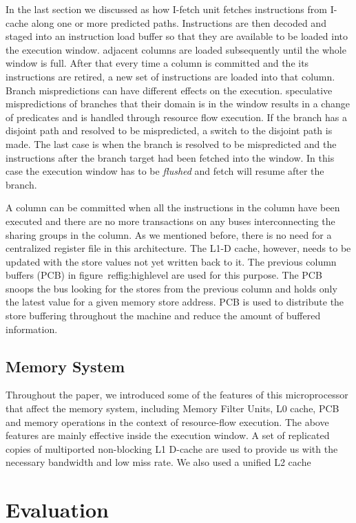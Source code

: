 \documentclass[10pt,twocolumn]{IEEEtran}
\begin{document}
In the last section we discussed as how I-fetch unit  fetches
instructions from I-cache along one or more predicted paths.
Instructions are then decoded and staged into an instruction load
buffer so that they are available to be loaded into the execution
window.  adjacent columns are loaded subsequently until the whole
window is full.  After that every time a column is committed and the
its instructions are retired, a new set of instructions are loaded into
that column.  Branch mispredictions can have different effects on the
execution.  speculative mispredictions of branches that their domain is
in the window results in a change of predicates and is handled through
resource flow execution.  If the branch has a disjoint path and
resolved to be mispredicted, a switch to the disjoint path is made.
The last case is when the branch is resolved to be mispredicted and the
instructions after the branch target had been fetched into the window.
In this case the execution window has to be \emph{flushed} and fetch
will resume after the branch.

A column can be committed when all the instructions in the column have
been executed and there are no more transactions on any buses
interconnecting the sharing groups in the column.  As we mentioned
before, there is no need for a centralized register file in this
architecture.  The L1-D cache, however, needs to be updated with the
store values not yet written back to it.  The previous column buffers
(PCB) in figure~ref{fig:highlevel} are used  for this purpose.  The PCB
snoops the bus looking for the stores from the previous column and
holds only the latest value for a given memory store address.  PCB is
used to distribute the store buffering throughout the machine and
reduce the amount of buffered information.

\subsection {Memory System}

Throughout the paper, we introduced some of the features of this
microprocessor that affect the memory system, including Memory Filter
Units, L0 cache, PCB and memory operations in the context of
resource-flow execution.  The above features are mainly effective
inside the execution window.  A set of replicated copies of multiported
non-blocking L1 D-cache are used to provide us with the necessary
bandwidth and low miss rate.  We also used a unified L2 cache

\section {Evaluation}
\end{document}
